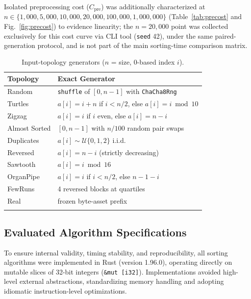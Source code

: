 \documentclass[namedate,webpdf,contemporary,large]{TBench-template}%
\theoremstyle{thmstyleone}%
\theoremstyle{thmstyletwo}%
\theoremstyle{thmstylethree}%
\begin{document}
Isolated preprocessing cost ($C_{\text{pre}}$) was additionally characterized at $n \in \{1{,}000, 5{,}000, 10{,}000, 20{,}000, 100{,}000, 1{,}000{,}000\}$ (Table~\ref{tab:precost} and Fig.~\ref{fig:precost}) to evidence linearity; the $n{=}20{,}000$ point was collected exclusively for this cost curve via CLI tool (\texttt{seed} 42), under the same paired-generation protocol, and is not part of the main sorting-time comparison matrix.


\begin{table}[!t]
\caption{Input-topology generators ($n$ = size, 0-based index $i$).\label{tab:datasets}}%
\small
\begin{tabular*}{\columnwidth}{@{\extracolsep\fill}ll@{\extracolsep\fill}}
\toprule
Topology & Exact Generator\\
\midrule
Random & \texttt{shuffle} of $[0,n{-}1]$ with \texttt{ChaCha8Rng}\\
Turtles & $a[i]=i+n$ if $i<n/2$, else $a[i]=i \bmod 10$\\
Zigzag & $a[i]=i$ if $i$ even, else $a[i]=n-i$\\
Almost Sorted & $[0,n{-}1]$ with $n/100$ random pair swaps\\
Duplicates & $a[i]\sim\mathcal{U}\{0,1,2\}$ i.i.d.\\
Reversed & $a[i]=n-i$ (strictly decreasing)\\
Sawtooth & $a[i]=i \bmod 16$\\
OrganPipe & $a[i]=i$ if $i<n/2$, else $n-1-i$\\
FewRuns & 4 reversed blocks at quartiles\\
Real & frozen byte-asset prefix\\
\botrule
\end{tabular*}
\end{table}

\subsection{Evaluated Algorithm Specifications}
To ensure internal validity, timing stability, and reproducibility, all sorting algorithms were implemented in Rust (version 1.96.0), operating directly on mutable slices of 32-bit integers (\texttt{\&mut [i32]}). Implementations avoided high-level external abstractions, standardizing memory handling and adopting idiomatic instruction-level optimizations.
\end{document}

